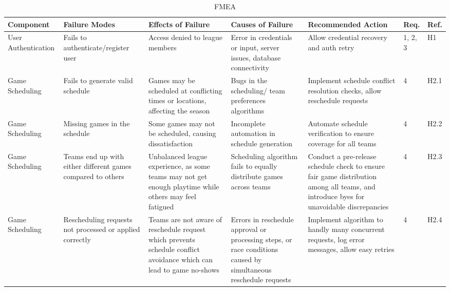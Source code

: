 \documentclass{article}
\begin{document}
\begin{landscape}
\begin{table}[hp]
    \caption{FMEA} \label{FMEA}
    \centering
    \begin{footnotesize}
    \begin{tabular}{|p{1in}|p{1in}|p{1in}|p{1.5in}|p{2.5in}|p{0.2in}|p{0.2in}|}
        \toprule
        \textbf{Component} & \textbf{Failure Modes} & \textbf{Effects of Failure} &\textbf{Causes of Failure}&\textbf{Recommended Action} &\textbf{Req.} &\textbf{Ref.} \\
        \bottomrule
        \hline
        
        User Authentication & 
        Fails to authenticate/register user
        & Access denied to league members & Error in credentials or input, server issues, database connectivity & Allow credential recovery and auth retry & 1, 2, 3 & H1 \\
        \hline
        Game Scheduling  & Fails to generate valid schedule & Games may be scheduled at conflicting times or locations, affecting the season & Bugs in the scheduling/ team preferences algorithms & Implement schedule conflict resolution checks, allow reschedule requests & 4 & H2.1 \\
        \hline
        Game Scheduling  & Missing games in the schedule & Some games may not be scheduled, causing dissatisfaction & Incomplete automation in schedule generation & Automate schedule verification to ensure coverage for all teams & 4 & H2.2 \\
        \hline
        Game Scheduling  &  Teams end up with either different games compared to others & Unbalanced league experience, as some teams may not get enough playtime while others may feel fatigued & Scheduling algorithm fails to equally distribute games across teams & Conduct a pre-release schedule check to ensure fair game distribution among all teams, and introduce byes for unavoidable discrepancies & 4 & H2.3 \\
        \hline
        Game Scheduling  & Rescheduling requests not processed or applied correctly  & Teams are not aware of reschedule request which prevents schedule conflict avoidance which can lead to game no-shows & Errors in reschedule approval or processing steps,  or race conditions caused by simultaneous reschedule requests & Implement algorithm to handly many concurrent requests, log error messages, allow easy retries  & 4 & H2.4 \\

\end{tabular}
\end{footnotesize}
\end{table}
\end{landscape}
\end{document}
